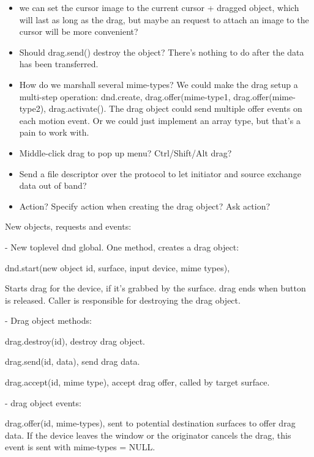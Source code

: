 \documentclass{article}
\begin{document}
\begin{itemize}
\item we can set the cursor image to the current cursor + dragged
  object, which will last as long as the drag, but maybe an request to
  attach an image to the cursor will be more convenient?

\item Should drag.send() destroy the object?  There's nothing to do
  after the data has been transferred.

\item How do we marshall several mime-types?  We could make the drag
  setup a multi-step operation: dnd.create, drag.offer(mime-type1,
  drag.offer(mime-type2), drag.activate().  The drag object could send
  multiple offer events on each motion event.  Or we could just
  implement an array type, but that's a pain to work with.

\item Middle-click drag to pop up menu?  Ctrl/Shift/Alt drag?

\item Send a file descriptor over the protocol to let initiator and
  source exchange data out of band?

\item Action?  Specify action when creating the drag object? Ask
  action?
\end{itemize}

New objects, requests and events:

  - New toplevel dnd global.  One method, creates a drag object:

	dnd.start(new object id, surface, input device, mime types), 

    Starts drag for the device, if it's grabbed by the surface. drag
    ends when button is released.  Caller is responsible for
    destroying the drag object.

  - Drag object methods:

	drag.destroy(id), destroy drag object.

	drag.send(id, data), send drag data.

	drag.accept(id, mime type), accept drag offer, called by
	target surface.

  - drag object events:

	drag.offer(id, mime-types), sent to potential destination
	surfaces to offer drag data.  If the device leaves the window
	or the originator cancels the drag, this event is sent with
	mime-types = NULL.
\end{document}
